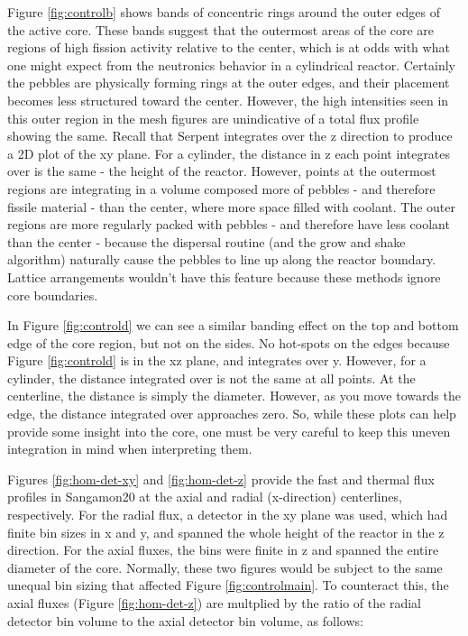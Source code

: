 Figure \ref{fig:controlb} shows bands of concentric rings around the outer edges of the active core.  These bands suggest that the outermost areas of the core are regions of high fission activity relative to the center, which is at odds with what one might expect from the neutronics behavior in a cylindrical reactor.  Certainly the pebbles are physically forming rings at the outer edges, and their placement becomes less structured toward the center.  However, the high intensities seen in this outer region in the mesh figures are unindicative of a total flux profile showing the same.  Recall that Serpent integrates over the z direction to produce a 2D plot of the xy plane.  For a cylinder, the distance in z each point integrates over is the same - the height of the reactor.  However, points at the outermost regions are integrating in a volume composed more of pebbles - and therefore fissile material - than the center, where more space filled with coolant.  The outer regions are more regularly packed with pebbles - and therefore have less coolant than the center - because the dispersal routine (and the grow and shake algorithm) naturally cause the pebbles to line up along the reactor boundary.  Lattice arrangements wouldn't have this feature because these methods ignore core boundaries.

In Figure \ref{fig:controld} we can see a similar banding effect on the top and bottom edge of the core region, but not on the sides.  No hot-spots on the edges because Figure \ref{fig:controld} is in the xz plane, and integrates over y.  However, for a cylinder, the distance integrated over is not the same at all points.  At the centerline, the distance is simply the diameter.  However, as you move towards the edge, the distance integrated over approaches zero.  So, while these plots can help provide some insight into the core, one must be very careful to keep this uneven integration in mind when interpreting them.




Figures \ref{fig:hom-det-xy} and \ref{fig:hom-det-z} provide the fast and thermal flux profiles in Sangamon20 at the axial and radial (x-direction) centerlines, respectively.  For the radial flux, a detector in the xy plane was used, which had finite bin sizes in x and y, and spanned the whole height of the reactor in the z direction.  For the axial fluxes, the bins were finite in z and spanned the entire diameter of the core.  Normally, these two figures would be subject to the same unequal bin sizing that affected Figure \ref{fig:controlmain}.  To counteract this, the axial fluxes (Figure \ref{fig:hom-det-z}) are multplied by the ratio of the radial detector bin volume to the axial detector bin volume, as follows:

